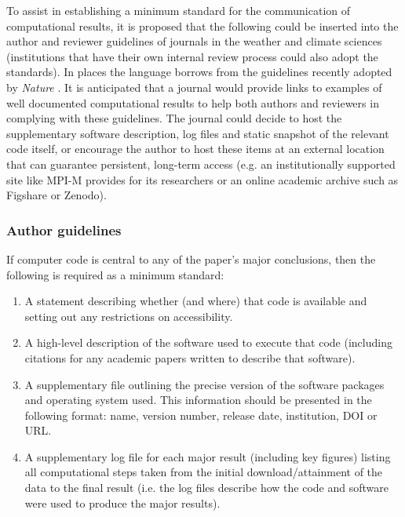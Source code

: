 To assist in establishing a minimum standard for the communication of computational results, it is proposed that the following could be inserted into the author and reviewer guidelines of journals in the weather and climate sciences (institutions that have their own internal review process could also adopt the standards). In places the language borrows from the guidelines recently adopted by \textit{Nature} \citep{Nature2014}. It is anticipated that a journal would provide links to examples of well documented computational results to help both authors and reviewers in complying with these guidelines. The journal could decide to host the supplementary software description, log files and static snapshot of the relevant code itself, or encourage the author to host these items at an external location that can guarantee persistent, long-term access (e.g. an institutionally supported site like MPI-M provides for its researchers or an online academic archive such as Figshare or Zenodo).

\subsubsection{Author guidelines}

If computer code is central to any of the paper's major conclusions, then the following is required as a minimum standard: 
\begin{enumerate}
\item A statement describing whether (and where) that code is available and setting out any restrictions on accessibility. 
\item A high-level description of the software used to execute that code (including citations for any academic papers written to describe that software).
\item A supplementary file outlining the precise version of the software packages and operating system used. This information should be presented in the following format: name, version number, release date, institution, DOI or URL.
\item A supplementary log file for each major result (including key figures) listing all computational steps taken from the initial download/attainment of the data to the final result (i.e. the log files describe how the code and software were used to produce the major results). 
\end{enumerate}

